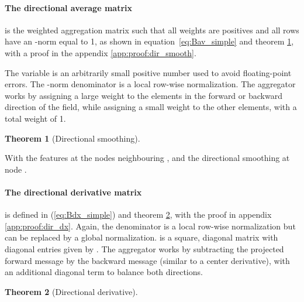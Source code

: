 \documentclass{article} \usepackage{arxiv,times}
\def\eqref#1{equation~\ref{#1}}
\newtheorem{theorem}{Theorem}[section]
\begin{document}
\paragraph{The directional average matrix }  is the weighted aggregation matrix such that all weights are positives and all rows have an -norm equal to 1, as shown in \eqref{eq:Bav_simple} and theorem \ref{th:dir_smooth}, with a proof in the appendix \ref{app:proof:dir_smooth}.

The variable  is an arbitrarily small positive number used to avoid floating-point errors.
The -norm denominator is a local row-wise normalization.
The aggregator works by assigning a large weight to the elements in the forward or backward direction of the field, while assigning a small weight to the other elements, with a total weight of 1.



\begin{theorem}[Directional smoothing]
\label{th:dir_smooth}
\end{theorem}

With  the features at the nodes  neighbouring , and  the directional smoothing at node .

\paragraph{The directional derivative matrix } is defined in (\ref{eq:Bdx_simple}) and theorem \ref{th:dir_dx}, with the proof in appendix \ref{app:proof:dir_dx}. Again, the denominator is a local row-wise normalization but can be replaced by a global normalization.  is a square, diagonal matrix with diagonal entries given by . The aggregator works by subtracting the projected forward message by the backward message (similar to a center derivative), with an additional diagonal term to balance both directions.




\begin{theorem}[Directional derivative]
\label{th:dir_dx}
\end{theorem}
\end{document}
